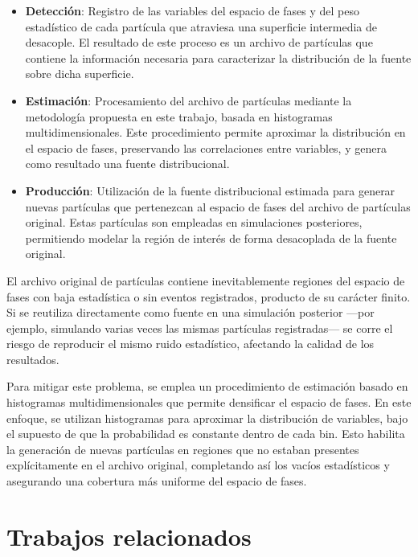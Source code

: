 \begin{itemize}
    \item \textbf{Detección}: Registro de las variables del espacio de fases y del peso estadístico de cada partícula que atraviesa una superficie intermedia de desacople. El resultado de este proceso es un archivo de partículas que contiene la información necesaria para caracterizar la distribución de la fuente sobre dicha superficie.

    \item \textbf{Estimación}: Procesamiento del archivo de partículas mediante la metodología propuesta en este trabajo, basada en histogramas multidimensionales. Este procedimiento permite aproximar la distribución en el espacio de fases, preservando las correlaciones entre variables, y genera como resultado una fuente distribucional.

    \item \textbf{Producción}: Utilización de la fuente distribucional estimada para generar nuevas partículas que pertenezcan al espacio de fases del archivo de partículas original. Estas partículas son empleadas en simulaciones posteriores, permitiendo modelar la región de interés de forma desacoplada de la fuente original.
\end{itemize}

El archivo original de partículas contiene inevitablemente regiones del espacio de fases con baja estadística o sin eventos registrados, producto de su carácter finito. Si se reutiliza directamente como fuente en una simulación posterior —por ejemplo, simulando varias veces las mismas partículas registradas— se corre el riesgo de reproducir el mismo ruido estadístico, afectando la calidad de los resultados.

Para mitigar este problema, se emplea un procedimiento de estimación basado en histogramas multidimensionales que permite densificar el espacio de fases. En este enfoque, se utilizan histogramas para aproximar la distribución de variables, bajo el supuesto de que la probabilidad es constante dentro de cada bin. Esto habilita la generación de nuevas partículas en regiones que no estaban presentes explícitamente en el archivo original, completando así los vacíos estadísticos y asegurando una cobertura más uniforme del espacio de fases.

\section{Trabajos relacionados}

